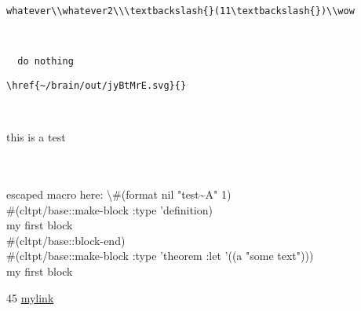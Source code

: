 \documentclass[11pt]{article}
\begin{document}
\begin{lstlisting}whatever\\whatever2\\\textbackslash{}(11\textbackslash{})\\wow\end{lstlisting}\\\begin{lstlisting}
  do nothing
\end{lstlisting}

\begin{lstlisting}\href{~/brain/out/jyBtMrE.svg}{}\end{lstlisting}\\\begin{dummy}
  this is a test
\end{dummy}\\\\escaped macro here: \textbackslash{}\#(format nil "test\textasciitilde{}A" 1)\\\#(cltpt/base::make-block :type 'definition)\\my first block\\\#(cltpt/base::block-end)\\\#(cltpt/base::make-block :type 'theorem :let '((a "some text")))\\  my first block\\  %
\item 45 \href{mylink}{mylink}
\end{document}
